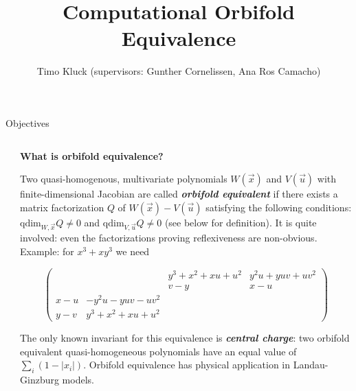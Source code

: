 \documentclass[final]{beamer}
\title{Computational Orbifold Equivalence} %
\author{Timo Kluck (supervisors: Gunther Cornelissen, Ana Ros Camacho)} %
\institute{Utrecht University} %
\newlength{\sepwid}
\newlength{\smallercolwid}
\begin{document}

\setlength{\belowcaptionskip}{2ex} %
\setlength\belowdisplayshortskip{2ex} %

\begin{frame}[t] %

\begin{alertblock}{Objectives}

\begin{columns}

\begin{column}{\sepwid}\end{column} %

\begin{column}{\smallercolwid} %

\justify

\textbf{\large{}What is orbifold equivalence?}{\large \par}

Two quasi-homogenous, multivariate polynomials $W(\vec{x})$
and $V(\vec{u})$ with finite-dimensional Jacobian are called \textbf{\emph{orbifold equivalent}} if there
exists a matrix factorization $Q$ of $W(\vec{x})-V(\vec{u})$
satisfying the following conditions: $\mathrm{qdim}_{W,\vec{x}}Q\neq0$
and $\mathrm{qdim}_{V,\vec{u}}Q\neq0$ (see below for definition).
It is quite involved: even the factorizations proving reflexiveness
are non-obvious. Example: for $x^{3}+xy^{3}$ we need

\[
\left(\begin{array}{cccc}
 &  & y^{3}+x^{2}+xu+u^{2} & y^{2}u+yuv+uv^{2}\\
 &  & v-y & x-u\\
x-u & -y^{2}u-yuv-uv^{2}\\
y-v & y^{3}+x^{2}+xu+u^{2}
\end{array}\right)
\]

The only known invariant for this equivalence is \textbf{\emph{central
charge}}: two orbifold equivalent quasi-homogeneous polynomials have an
equal value of $\sum_{i}(1 - |x_i|)$.
Orbifold equivalence has physical application in Landau-Ginzburg models.

\bigskip


\end{column}
\end{columns}
\end{alertblock}
\end{frame}
\end{document}
